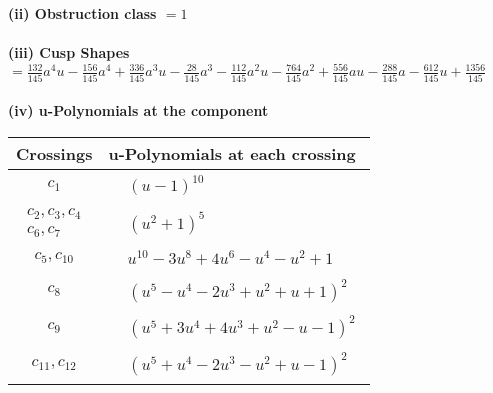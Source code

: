 \documentclass[1p]{elsarticle_modified}
\theoremstyle{definition}
\begin{document}
\flushleft \textbf{(ii) Obstruction class $= 1$}\\~\\
\flushleft \textbf{(iii) Cusp Shapes $= \frac{132}{145} a^4 u-\frac{156}{145} a^4+\frac{336}{145} a^3 u-\frac{28}{145} a^3-\frac{112}{145} a^2 u-\frac{764}{145} a^2+\frac{556}{145} a u-\frac{288}{145} a-\frac{612}{145} u+\frac{1356}{145}$}\\~\\
\newpage\renewcommand{\arraystretch}{1}
\flushleft \textbf{(iv) u-Polynomials at the component}\newline \\
\begin{tabular}{m{50pt}|m{274pt}}
Crossings & \hspace{64pt}u-Polynomials at each crossing \\
\hline $$\begin{aligned}c_{1}\end{aligned}$$&$\begin{aligned}
&(u-1)^{10}
\end{aligned}$\\
\hline $$\begin{aligned}c_{2},c_{3},c_{4}\\c_{6},c_{7}\end{aligned}$$&$\begin{aligned}
&(u^2+1)^5
\end{aligned}$\\
\hline $$\begin{aligned}c_{5},c_{10}\end{aligned}$$&$\begin{aligned}
&u^{10}-3 u^8+4 u^6- u^4- u^2+1
\end{aligned}$\\
\hline $$\begin{aligned}c_{8}\end{aligned}$$&$\begin{aligned}
&(u^5- u^4-2 u^3+u^2+u+1)^2
\end{aligned}$\\
\hline $$\begin{aligned}c_{9}\end{aligned}$$&$\begin{aligned}
&(u^5+3 u^4+4 u^3+u^2- u-1)^2
\end{aligned}$\\
\hline $$\begin{aligned}c_{11},c_{12}\end{aligned}$$&$\begin{aligned}
&(u^5+u^4-2 u^3- u^2+u-1)^2
\end{aligned}$\\
\hline
\end{tabular}\\~\\
\end{document}
